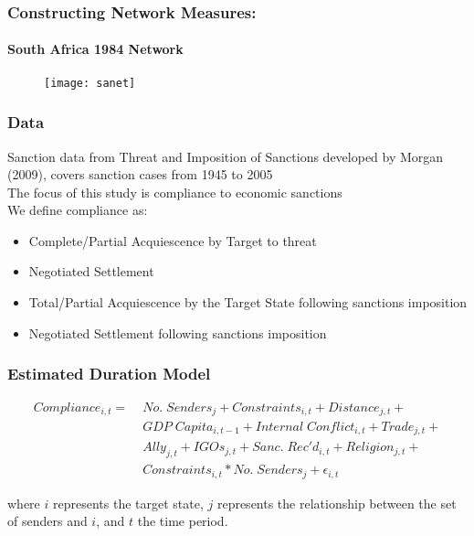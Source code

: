 \documentclass{beamer}
\begin{document}
\begin{frame}
\frametitle{Constructing Network Measures:}
\framesubtitle{South Africa 1984 Network}

\begin{figure}[ht]
	\centering
	\texttt{[image: sanet]}
\end{figure}

\end{frame}

\begin{frame}
\frametitle{Data}

Sanction data from Threat and Imposition of Sanctions developed by Morgan (2009), covers sanction cases from 1945 to 2005 \\
\vspace{0.5cm}
The focus of this study is compliance to economic sanctions \\
\vspace{0.5cm}
We define compliance as:

\begin{itemize}
	\item Complete/Partial Acquiescence by Target to threat
	\item Negotiated Settlement
	\item Total/Partial Acquiescence by the Target State following sanctions imposition
	\item Negotiated Settlement following sanctions imposition
\end{itemize}

\end{frame}

\begin{frame}
\frametitle{Estimated Duration Model}

\begin{align*}
Compliance_{i,t} =\; & No. \; Senders_{j} + Constraints_{i,t} + Distance_{j,t} + \\
 &GDP \; Capita_{i,t-1} +  Internal \; Conflict_{i,t} + Trade_{j,t} + \\
 &Ally_{j,t} + IGOs_{j,t} + Sanc. \; Rec'd_{i,t} + Religion_{j,t} + \\
 &Constraints_{i,t}*No. \; Senders_{j} + \epsilon_{i,t}
\end{align*}

where $i$ represents the target state, $j$ represents the relationship between the set of senders and $i$, and $t$ the time period.

\end{frame}
\end{document}
